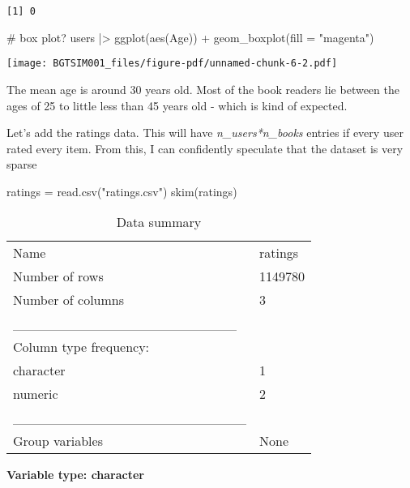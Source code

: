 \documentclass[
]{report}
\newenvironment{Shaded}{\begin{snugshade}}{\end{snugshade}}
\newcommand{\AttributeTok}[1]{\textcolor[rgb]{0.40,0.45,0.13}{#1}}
\newcommand{\CommentTok}[1]{\textcolor[rgb]{0.37,0.37,0.37}{#1}}
\newcommand{\FunctionTok}[1]{\textcolor[rgb]{0.28,0.35,0.67}{#1}}
\newcommand{\NormalTok}[1]{\textcolor[rgb]{0.00,0.23,0.31}{#1}}
\newcommand{\OtherTok}[1]{\textcolor[rgb]{0.00,0.23,0.31}{#1}}
\newcommand{\SpecialCharTok}[1]{\textcolor[rgb]{0.37,0.37,0.37}{#1}}
\newcommand{\StringTok}[1]{\textcolor[rgb]{0.13,0.47,0.30}{#1}}
\begin{document}
\begin{verbatim}
[1] 0
\end{verbatim}

\begin{Shaded}
\begin{Highlighting}[]
\CommentTok{\# box plot? }
\NormalTok{users }\SpecialCharTok{|\textgreater{}} \FunctionTok{ggplot}\NormalTok{(}\FunctionTok{aes}\NormalTok{(Age)) }\SpecialCharTok{+} \FunctionTok{geom\_boxplot}\NormalTok{(}\AttributeTok{fill =} \StringTok{"magenta"}\NormalTok{)}
\end{Highlighting}
\end{Shaded}

\texttt{[image: BGTSIM001\_files/figure-pdf/unnamed-chunk-6-2.pdf]}

The mean age is around 30 years old. Most of the book readers lie
between the ages of 25 to little less than 45 years old - which is kind
of expected.

Let's add the ratings data. This will have \emph{n\_users*n\_books}
entries if every user rated every item. From this, I can confidently
speculate that the dataset is very sparse

\begin{Shaded}
\begin{Highlighting}[]
\NormalTok{ratings }\OtherTok{=} \FunctionTok{read.csv}\NormalTok{(}\StringTok{"ratings.csv"}\NormalTok{)}
\FunctionTok{skim}\NormalTok{(ratings)}
\end{Highlighting}
\end{Shaded}

\begin{longtable}[]{@{}ll@{}}
\caption{Data summary}\tabularnewline
\toprule\noalign{}
\endfirsthead
\endhead
\bottomrule\noalign{}
\endlastfoot
Name & ratings \\
Number of rows & 1149780 \\
Number of columns & 3 \\
\_\_\_\_\_\_\_\_\_\_\_\_\_\_\_\_\_\_\_\_\_\_\_ & \\
Column type frequency: & \\
character & 1 \\
numeric & 2 \\
\_\_\_\_\_\_\_\_\_\_\_\_\_\_\_\_\_\_\_\_\_\_\_\_ & \\
Group variables & None \\
\end{longtable}

\textbf{Variable type: character}
\end{document}

